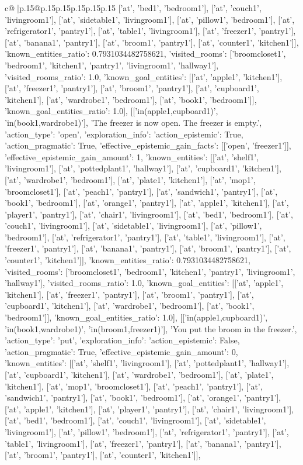 \documentclass{article}
\begin{document}
{\begin{supertabular}{c@{$\;$}|p{.15\linewidth}@{}p{.15\linewidth}p{.15\linewidth}p{.15\linewidth}p{.15\linewidth}p{.15\linewidth}}
{{{['at', 'bed1', 'bedroom1'], ['at', 'couch1', 'livingroom1'], ['at', 'sidetable1', 'livingroom1'], ['at', 'pillow1', 'bedroom1'], ['at', 'refrigerator1', 'pantry1'], ['at', 'table1', 'livingroom1'], ['at', 'freezer1', 'pantry1'], ['at', 'banana1', 'pantry1'], ['at', 'broom1', 'pantry1'], ['at', 'counter1', 'kitchen1']], 'known_entities_ratio': 0.7931034482758621, 'visited_rooms': ['broomcloset1', 'bedroom1', 'kitchen1', 'pantry1', 'livingroom1', 'hallway1'], 'visited_rooms_ratio': 1.0, 'known_goal_entities': [['at', 'apple1', 'kitchen1'], ['at', 'freezer1', 'pantry1'], ['at', 'broom1', 'pantry1'], ['at', 'cupboard1', 'kitchen1'], ['at', 'wardrobe1', 'bedroom1'], ['at', 'book1', 'bedroom1']], 'known_goal_entities_ratio': 1.0}}], [['in(apple1,cupboard1)', 'in(book1,wardrobe1)'], 'The freezer is now open. The freezer is empty.', {'action_type': 'open', 'exploration_info': {'action_epistemic': True, 'action_pragmatic': True, 'effective_epistemic_gain_facts': [['open', 'freezer1']], 'effective_epistemic_gain_amount': 1, 'known_entities': [['at', 'shelf1', 'livingroom1'], ['at', 'pottedplant1', 'hallway1'], ['at', 'cupboard1', 'kitchen1'], ['at', 'wardrobe1', 'bedroom1'], ['at', 'plate1', 'kitchen1'], ['at', 'mop1', 'broomcloset1'], ['at', 'peach1', 'pantry1'], ['at', 'sandwich1', 'pantry1'], ['at', 'book1', 'bedroom1'], ['at', 'orange1', 'pantry1'], ['at', 'apple1', 'kitchen1'], ['at', 'player1', 'pantry1'], ['at', 'chair1', 'livingroom1'], ['at', 'bed1', 'bedroom1'], ['at', 'couch1', 'livingroom1'], ['at', 'sidetable1', 'livingroom1'], ['at', 'pillow1', 'bedroom1'], ['at', 'refrigerator1', 'pantry1'], ['at', 'table1', 'livingroom1'], ['at', 'freezer1', 'pantry1'], ['at', 'banana1', 'pantry1'], ['at', 'broom1', 'pantry1'], ['at', 'counter1', 'kitchen1']], 'known_entities_ratio': 0.7931034482758621, 'visited_rooms': ['broomcloset1', 'bedroom1', 'kitchen1', 'pantry1', 'livingroom1', 'hallway1'], 'visited_rooms_ratio': 1.0, 'known_goal_entities': [['at', 'apple1', 'kitchen1'], ['at', 'freezer1', 'pantry1'], ['at', 'broom1', 'pantry1'], ['at', 'cupboard1', 'kitchen1'], ['at', 'wardrobe1', 'bedroom1'], ['at', 'book1', 'bedroom1']], 'known_goal_entities_ratio': 1.0}}], [['in(apple1,cupboard1)', 'in(book1,wardrobe1)', 'in(broom1,freezer1)'], 'You put the broom in the freezer.', {'action_type': 'put', 'exploration_info': {'action_epistemic': False, 'action_pragmatic': True, 'effective_epistemic_gain_amount': 0, 'known_entities': [['at', 'shelf1', 'livingroom1'], ['at', 'pottedplant1', 'hallway1'], ['at', 'cupboard1', 'kitchen1'], ['at', 'wardrobe1', 'bedroom1'], ['at', 'plate1', 'kitchen1'], ['at', 'mop1', 'broomcloset1'], ['at', 'peach1', 'pantry1'], ['at', 'sandwich1', 'pantry1'], ['at', 'book1', 'bedroom1'], ['at', 'orange1', 'pantry1'], ['at', 'apple1', 'kitchen1'], ['at', 'player1', 'pantry1'], ['at', 'chair1', 'livingroom1'], ['at', 'bed1', 'bedroom1'], ['at', 'couch1', 'livingroom1'], ['at', 'sidetable1', 'livingroom1'], ['at', 'pillow1', 'bedroom1'], ['at', 'refrigerator1', 'pantry1'], ['at', 'table1', 'livingroom1'], ['at', 'freezer1', 'pantry1'], ['at', 'banana1', 'pantry1'], ['at', 'broom1', 'pantry1'], ['at', 'counter1', 'kitchen1']], }}}
\end{supertabular}}
\end{document}
